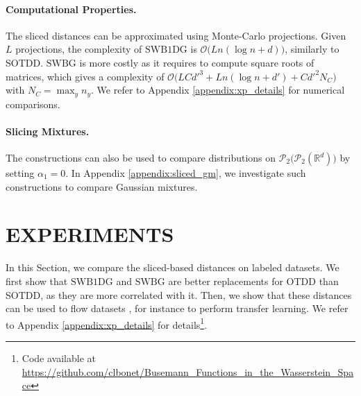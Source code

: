 \documentclass[twoside]{article}
\newcommand{\cP}{\mathcal{P}}
\newcommand{\cO}{\mathcal{O}}
\newcommand{\cPP}[1]{\mathcal{P}_2\big(\cP_2(#1)\big)}
\newcommand{\R}{\mathbb{R}}
\newcommand{\swbdg}{\mathrm{SWB1DG}}
\newcommand{\swbg}{\mathrm{SWBG}}
\begin{document}
\paragraph{Computational Properties.} 

The sliced distances can be approximated using Monte-Carlo projections. Given $L$ projections, the complexity of $\swbdg$ is $\cO\big(Ln(\log n + d)\big)$, similarly to SOTDD. $\swbg$ is more costly as it requires to compute square roots of matrices, which gives a complexity of $\cO\big(LCd'^{3} + Ln(\log n + d') + Cd'^{2} N_C\big)$ with $N_C=\max_y n_y$. We refer to Appendix \ref{appendix:xp_details} for numerical comparisons. %

\paragraph{Slicing Mixtures.}  The constructions can also be used to compare distributions on $\cPP{\R^d}$ by setting $\alpha_1=0$. 
In Appendix \ref{appendix:sliced_gm}, we investigate such constructions to compare Gaussian mixtures.


















\section{EXPERIMENTS} \label{sec:xps}


 In this Section, we compare the sliced-based distances on labeled datasets. We first show that $\swbdg$ and $\swbg$ are better replacements for OTDD than SOTDD, as they are more correlated with it. Then, we show that these distances can be used to flow datasets \citep{alvarez2021dataset}, for instance to perform transfer learning. We refer to Appendix \ref{appendix:xp_details} for details\footnote{Code available at \url{https://github.com/clbonet/Busemann_Functions_in_the_Wasserstein_Space}}. 


    
    
\end{document}

